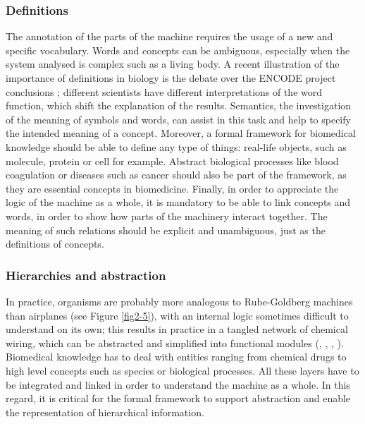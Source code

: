 \subsubsection{Definitions}
\label{reqdef}

The annotation of the parts of the machine requires the usage of a new and specific vocabulary. Words and concepts can be ambiguous, especially when the system analysed is complex such as a living body. A recent illustration of the importance of definitions in biology is the debate over the ENCODE project conclusions \citep{Form_and_function_2013}; different scientists have different interpretations of the word function, which shift the explanation of the results. Semantics, the investigation of the meaning of symbols and words, can assist in this task and help to specify the intended meaning of a concept. Moreover, a formal framework for biomedical knowledge should be able to define any type of things: real-life objects, such as molecule, protein or cell for example. Abstract biological processes like blood coagulation or diseases such as cancer should also be part of the framework, as they are essential concepts in biomedicine. Finally, in order to appreciate the logic of the machine as a whole, it is mandatory to be able to link concepts and words, in order to show how parts of the machinery interact together. The meaning of such relations should be explicit and unambiguous, just as the definitions of concepts.

\subsubsection{Hierarchies and abstraction}
\label{reqhie}

In practice, organisms are probably more analogous to Rube-Goldberg machines than airplanes (see Figure \ref{fig2-5}), with an internal logic sometimes difficult to understand on its own; this results in practice in a tangled network of chemical wiring, which can be abstracted and simplified into functional modules (\cite{hartwell1999molecular}, \cite{ravasz2002hierarchical}, \cite{machado2011modeling}, \cite{fisher2007executable}). Biomedical knowledge has to deal with entities ranging from chemical drugs to high level concepts such as species or biological processes. All these layers have to be integrated and linked in order to understand the machine as a whole. In this regard, it is critical for the formal framework to support abstraction and enable the representation of hierarchical information.

